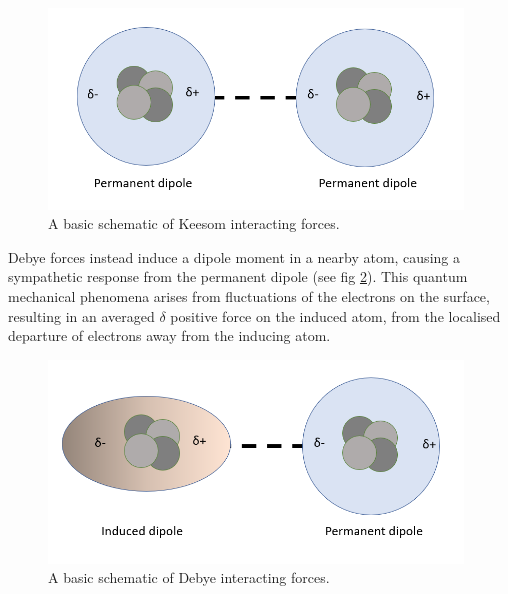
\cite{lilBlueBook} \cite{IsGreenBook}  \cite{FoundColloidBook}



\begin{figure}[h!!!!!!!!!!!!!!!!!!!!!!!!!]     %
        \begin{center}
          \includegraphics[width=110mm]{chapter1/keesom.PNG}
\end{center}
\caption{A basic schematic of Keesom interacting forces.}
\label{fig:keesom}                 %
\end{figure}



Debye forces instead induce a dipole moment in a nearby atom, causing a sympathetic response from the permanent dipole (see fig \ref{fig:debye}). This quantum mechanical phenomena arises from fluctuations of the electrons on the surface, resulting in an averaged $\delta$ positive force on the induced atom, from the localised departure of electrons away from the inducing atom. 

\begin{figure}[h!]     %
        \begin{center}
          \includegraphics[width=110mm]{chapter1/debye.PNG}
\end{center}
\caption{A basic schematic of Debye interacting forces.}
\label{fig:debye}                 %
\end{figure}

